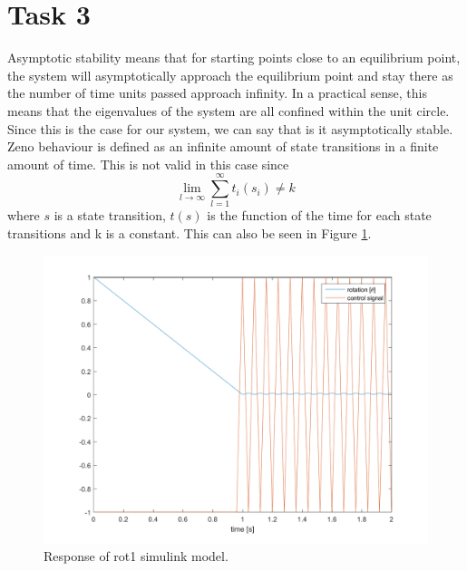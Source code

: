 \documentclass[a4paper,12pt,oneside,onecolumn]{article} %
\begin{document}
\section*{Task 3}
Asymptotic stability means that for starting points close to an
equilibrium point, the system will asymptotically approach the equilibrium point
and stay there as the number of time units passed approach infinity. In a
practical sense, this means that the eigenvalues of the system are all confined
within the unit circle. Since this is the case for our system, we can say that
is it asymptotically stable.  Zeno behaviour is defined as an infinite amount of
state transitions in a finite amount of time. This is not valid in this case
since 
\begin{equation}
  \lim_{l \to \infty}\sum\limits_{l=1}^\infty t_i(s_i) \neq k
\end{equation}
where $s$ is a state transition, $t(s)$ is the function of the time 
for each state transitions and k is a constant.
This can also be seen in Figure \ref{fig:task3_plot}.
\begin{figure}[H]
    \centering
    \includegraphics[scale=0.5]{../matlab/images/task3_plot.png}
    \caption{Response of rot1 simulink model.}
    \label{fig:task3_plot}
\end{figure}
\end{document}
